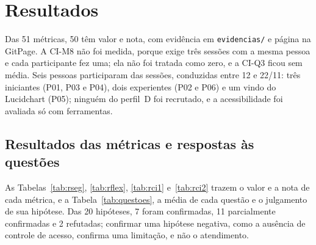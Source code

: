 \documentclass[conference]{IEEEtran}
\begin{document}
\section{Resultados}
\label{sec:res}

Das 51 métricas, 50 têm valor e nota, com evidência em
\texttt{evidencias/} e página na GitPage. A CI-M8 não foi medida, porque
exige três sessões com a mesma pessoa e cada participante fez uma; ela não
foi tratada como zero, e a CI-Q3 ficou sem média. Seis pessoas participaram
das sessões, conduzidas entre 12 e 22/11: três iniciantes (P01, P03 e P04),
dois experientes (P02 e P06) e um vindo do Lucidchart (P05); ninguém do
perfil~D foi recrutado, e a acessibilidade foi avaliada só com ferramentas.

\subsection{Resultados das métricas e respostas às questões}

As Tabelas~\ref{tab:rseg}, \ref{tab:rflex}, \ref{tab:rci1} e~\ref{tab:rci2}
trazem o valor e a nota de cada métrica, e a Tabela~\ref{tab:questoes}, a
média de cada questão e o julgamento de sua hipótese. Das 20 hipóteses, 7
foram confirmadas, 11 parcialmente confirmadas e 2 refutadas; confirmar uma
hipótese negativa, como a ausência de controle de acesso, confirma uma
limitação, e não o atendimento.
\end{document}
